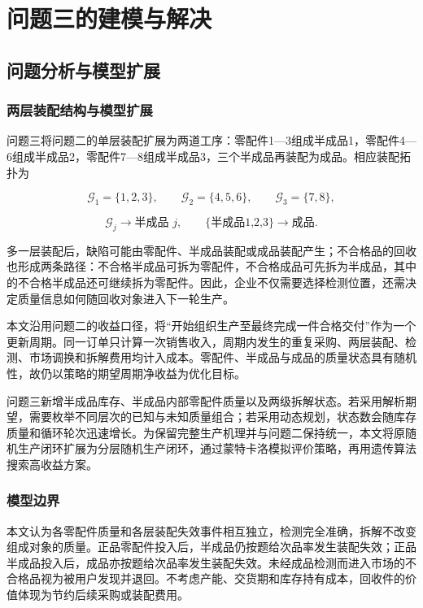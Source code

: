 \documentclass{cumcm}
\numberwithin{figure}{section}
\numberwithin{table}{section}
\begin{document}
\FloatBarrier
\section{问题三的建模与解决}\label{ux95eeux9898ux4e09ux7684ux5efaux6a21ux4e0eux89e3ux51b3}

\subsection{问题分析与模型扩展}\label{ux95eeux9898ux5206ux6790ux4e0eux6a21ux578bux6269ux5c55}

\subsubsection{两层装配结构与模型扩展}\label{ux4e24ux5c42ux88c5ux914dux7ed3ux6784ux4e0eux6a21ux578bux6269ux5c55}

问题三将问题二的单层装配扩展为两道工序：零配件1---3组成半成品1，零配件4---6组成半成品2，零配件7---8组成半成品3，三个半成品再装配为成品。相应装配拓扑为

\[
\mathcal G_1=\{1,2,3\},\qquad
\mathcal G_2=\{4,5,6\},\qquad
\mathcal G_3=\{7,8\},
\]

\[
\mathcal G_j\longrightarrow \text{半成品 }j,
\qquad
\{\text{半成品1,2,3}\}\longrightarrow\text{成品}.
\]

多一层装配后，缺陷可能由零配件、半成品装配或成品装配产生；不合格品的回收也形成两条路径：不合格半成品可拆为零配件，不合格成品可先拆为半成品，其中的不合格半成品还可继续拆为零配件。因此，企业不仅需要选择检测位置，还需决定质量信息如何随回收对象进入下一轮生产。

本文沿用问题二的收益口径，将``开始组织生产至最终完成一件合格交付''作为一个更新周期。同一订单只计算一次销售收入，周期内发生的重复采购、两层装配、检测、市场调换和拆解费用均计入成本。零配件、半成品与成品的质量状态具有随机性，故仍以策略的期望周期净收益为优化目标。

问题三新增半成品库存、半成品内部零配件质量以及两级拆解状态。若采用解析期望，需要枚举不同层次的已知与未知质量组合；若采用动态规划，状态数会随库存质量和循环轮次迅速增长。为保留完整生产机理并与问题二保持统一，本文将原随机生产闭环扩展为分层随机生产闭环，通过蒙特卡洛模拟评价策略，再用遗传算法搜索高收益方案。

\subsubsection{模型边界}\label{ux6a21ux578bux8fb9ux754c}

本文认为各零配件质量和各层装配失效事件相互独立，检测完全准确，拆解不改变组成对象的质量。正品零配件投入后，半成品仍按题给次品率发生装配失效；正品半成品投入后，成品亦按题给次品率发生装配失效。未经成品检测而进入市场的不合格品视为被用户发现并退回。不考虑产能、交货期和库存持有成本，回收件的价值体现为节约后续采购或装配费用。
\end{document}
